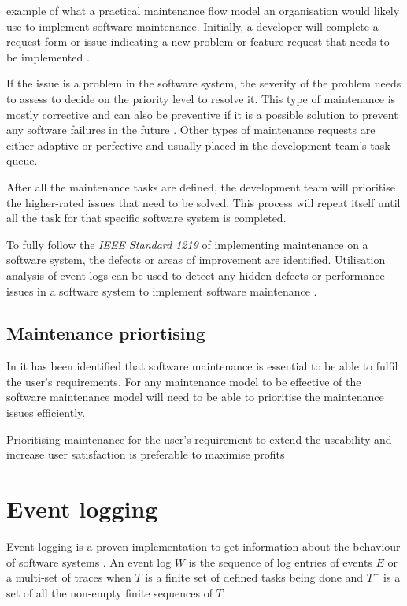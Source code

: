  example of what a practical maintenance flow model an organisation would likely use to implement software maintenance. Initially, a developer will complete a request form or issue indicating a new problem or feature request that needs to be implemented \cite{Tang2010}.\par If the issue is a problem in the software system, the severity of the problem needs to assess to decide on the priority level to resolve it. This type of maintenance is mostly corrective and can also be preventive if it is a possible solution to prevent any software failures in the future \cite{Tang2010}. Other types of maintenance requests are either adaptive or perfective and usually placed in the development team's task queue.\par After all the maintenance tasks are defined, the development team will prioritise the higher-rated issues that need to be solved. This process will repeat itself until all the task for that specific software system is completed.\par To fully follow the \textit{IEEE Standard 1219} of implementing maintenance on a software system, the defects or areas of improvement are identified. Utilisation analysis of event logs can be used to detect any hidden defects or performance issues in a software system to implement software maintenance \cite{Cinque2013, Rong2018a, Levin2019}.

\subsection{Maintenance priortising}\label{sec:ch1_maintenancePriortising}
In  it has been identified that software maintenance is essential to be able to fulfil the user's requirements. For any maintenance model to be effective of  the software maintenance model will need to be able to prioritise the maintenance issues efficiently. \par Prioritising maintenance for the user's requirement to extend the useability and increase user satisfaction is preferable to maximise profits


\clearpage

\section{Event logging}\label{sec:ch1_eventLogging}
Event logging is a proven implementation to get information about the behaviour of software systems \cite{Baccanico2014}. An event log $W$ is the sequence of log entries of events $E$ or a multi-set of traces when $T$ is a finite set of defined tasks being done and $T^+$ is a set of all the non-empty finite sequences of $T$ \cite{Kherbouche2017}

